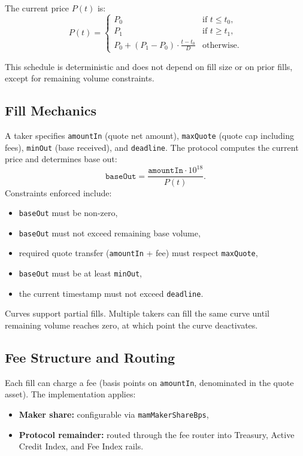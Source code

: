 \documentclass[version=preprint]{iacrcc}
\begin{document}
The current price $P(t)$ is:
\[
P(t) =
\begin{cases}
P_0 & \text{if } t \le t_0, \\
P_1 & \text{if } t \ge t_1, \\
P_0 + (P_1 - P_0)\cdot\frac{t - t_0}{D} & \text{otherwise}.
\end{cases}
\]

This schedule is deterministic and does not depend on fill size or on prior fills, except for remaining volume constraints.

\subsection{Fill Mechanics}

A taker specifies \texttt{amountIn} (quote net amount), \texttt{maxQuote} (quote cap including fees), \texttt{minOut} (base received), and \texttt{deadline}. The protocol computes the current price and determines base out:
\[
\texttt{baseOut} = \frac{\texttt{amountIn}\cdot 10^{18}}{P(t)}.
\]
Constraints enforced include:
\begin{itemize}
  \item \texttt{baseOut} must be non-zero,
  \item \texttt{baseOut} must not exceed remaining base volume,
  \item required quote transfer (\texttt{amountIn} + fee) must respect \texttt{maxQuote},
  \item \texttt{baseOut} must be at least \texttt{minOut},
  \item the current timestamp must not exceed \texttt{deadline}.
\end{itemize}

Curves support partial fills. Multiple takers can fill the same curve until remaining volume reaches zero, at which point the curve deactivates.

\subsection{Fee Structure and Routing}

Each fill can charge a fee (basis points on \texttt{amountIn}, denominated in the quote asset). The implementation applies:
\begin{itemize}
  \item \textbf{Maker share:} configurable via \texttt{mamMakerShareBps},
  \item \textbf{Protocol remainder:} routed through the fee router into Treasury, Active Credit Index, and Fee Index rails.
\end{itemize}
\end{document}
